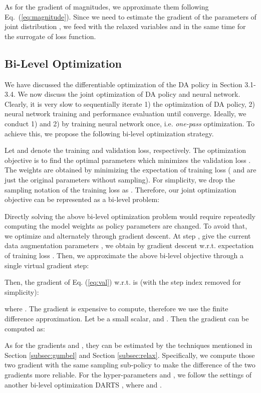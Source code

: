 \documentclass[runningheads]{llncs}
\begin{document}
As for the gradient of magnitudes, we approximate them following Eq.~(\ref{eq:magnitude}).
{Since we need to estimate the gradient of the parameters of joint distribution , we  feed  with the relaxed variables  and  in the same time for the surrogate of loss function.}

\subsection{Bi-Level Optimization}
\label{subsec:bilevel}
We have discussed the differentiable optimization  of the DA policy in Section 3.1-3.4. We now discuss the joint optimization of  DA policy and neural network.
{Clearly, it is very slow to sequentially iterate  1) the optimization of  DA policy,  2) neural network training  and  performance evaluation until converge. Ideally, we conduct 1) and 2) by training neural network once, i.e. \emph{one-pass} optimization. To achieve this, we propose the following  bi-level optimization strategy.}




Let  and  denote the training and  validation loss, respectively. The optimization objective is to find
the optimal parameters  which
minimizes the validation loss . The weights  are obtained by minimizing the expectation of 
training loss 
( and  are just the original parameters without sampling).
For simplicity, we drop
the sampling notation of the  training loss as  .
Therefore, our joint optimization objective can be represented as a bi-level problem:


Directly solving the above bi-level optimization problem would require repeatedly computing the model weights  as policy parameters  are changed.
To avoid that,
we optimize  and  alternately through gradient descent. At step , give the current data augmentation parameters , we obtain  by gradient descent w.r.t. expectation of training loss . Then, we approximate the above bi-level objective through a single virtual gradient step:

Then, the gradient of Eq. (\ref{eq:val}) w.r.t.  is (with the step index  removed for simplicity):

where .
The gradient is expensive to compute, therefore we use the  finite difference approximation. Let  be a small scalar,  and . Then the gradient can be computed as:

As for the gradients  and , they can be estimated by the techniques mentioned in Section \ref{subsec:gumbel} and Section \ref{subsec:relax}. Specifically, we compute those two gradient with the same sampling sub-policy  to make the difference of the two gradients more reliable.
For the hyper-parameters  and , we follow the settings of another bi-level optimization DARTS \cite{DBLP:conf/iclr/LiuSY19}, where  and . 
\end{document}
